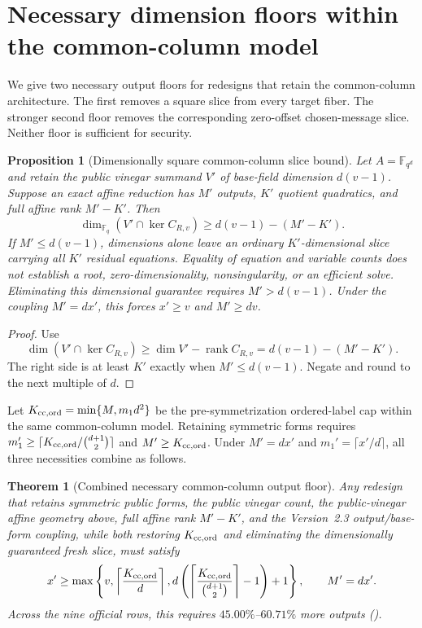 \documentclass[11pt]{article}
\newtheorem{theorem}{Theorem}[section]
\newtheorem{proposition}[proposition]{Proposition}
\newcommand{\F}{\mathbb F}
\newcommand{\rank}{\operatorname{rank}}
\begin{document}
\FloatBarrier

\section{Necessary dimension floors within the common-column model}
\label{sec:upgrade-repair}

We give two necessary output floors for redesigns that retain the
common-column architecture.  The first removes a square slice from every
target fiber.  The stronger second floor removes the corresponding
zero-offset chosen-message slice.  Neither floor is sufficient for security.

\begin{proposition}[Dimensionally square common-column slice bound]
\label{prop:upgrade-fresh-square-floor}
Let $A=\F_{q^d}$ and retain the public vinegar summand
$V'$ of base-field dimension $d(v-1)$.  Suppose an exact affine reduction has
$M'$ outputs, $K'$ quotient quadratics, and full affine rank $M'-K'$.  Then
\[
 \dim_{\F_q}(V'\cap\ker C_{R,v})
 \ge d(v-1)-(M'-K').
\]
If $M'\le d(v-1)$, dimensions alone leave an ordinary $K'$-dimensional slice
carrying all $K'$ residual equations.  Equality of equation and variable
counts does not establish a root, zero-dimensionality, nonsingularity, or an
efficient solve.  Eliminating this dimensional guarantee requires
$M'>d(v-1)$.  Under the coupling $M'=dx'$, this forces $x'\ge v$ and
$M'\ge dv$.
\end{proposition}

\begin{proof}
Use
\[
 \dim(V'\cap\ker C_{R,v})
 \ge\dim V'-\rank C_{R,v}
 =d(v-1)-(M'-K').
\]
The right side is at least $K'$ exactly when $M'\le d(v-1)$.  Negate and
round to the next multiple of $d$.
\end{proof}

Let $K_{\rm cc,ord}=\min\{M,m_1d^2\}$ be the pre-symmetrization ordered-label
cap within the same common-column model.  Retaining symmetric forms requires
$m_1'\ge\lceil K_{\rm cc,ord}/\binom{d+1}{2}\rceil$ and
$M'\ge K_{\rm cc,ord}$.  Under
$M'=dx'$ and $m_1'=\lceil x'/d\rceil$, all three necessities combine as
follows.

\begin{theorem}[Combined necessary common-column output floor]
\label{thm:upgrade-combined-floor}
Any redesign that retains symmetric public forms, the public vinegar count,
the public-vinegar affine geometry above, full affine rank $M'-K'$, and the
Version~2.3 output/base-form coupling, while both restoring
$K_{\rm cc,ord}$ and eliminating the dimensionally guaranteed fresh slice,
must satisfy
\begin{equation}
 x'\ge\max\left\{
 v,
  \left\lceil\frac{K_{\rm cc,ord}}d\right\rceil,
 d\left(
  \left\lceil\frac{K_{\rm cc,ord}}{\binom{d+1}{2}}\right\rceil-1
 \right)+1
 \right\},
 \qquad M'=dx'.                                      \label{eq:upgrade-combined-floor}
\end{equation}
Across the nine official rows, this requires $45.00\%$--$60.71\%$ more
outputs ().
\end{theorem}
\end{document}
